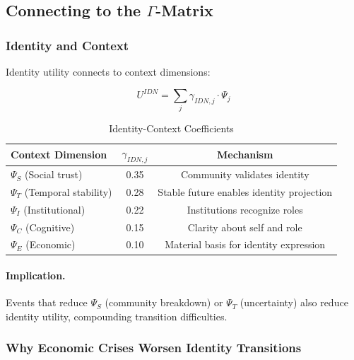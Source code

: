 \subsection{Connecting to the $\Gamma$-Matrix}

\subsubsection{Identity and Context}

Identity utility connects to context dimensions:

\begin{equation}
U^{IDN} = \sum_j \gamma_{IDN,j} \cdot \Psi_j
\end{equation}

\begin{table}[htbp]
\centering
\caption{Identity-Context Coefficients}
\label{tab:identity-context}
\begin{tabular}{@{}lcc@{}}
\toprule
\textbf{Context Dimension} & \textbf{$\gamma_{IDN,j}$} & \textbf{Mechanism} \\
\midrule
$\Psi_S$ (Social trust) & 0.35 & Community validates identity \\
$\Psi_T$ (Temporal stability) & 0.28 & Stable future enables identity projection \\
$\Psi_I$ (Institutional) & 0.22 & Institutions recognize roles \\
$\Psi_C$ (Cognitive) & 0.15 & Clarity about self and role \\
$\Psi_E$ (Economic) & 0.10 & Material basis for identity expression \\
\bottomrule
\end{tabular}
\end{table}

\paragraph{Implication.}
Events that reduce $\Psi_S$ (community breakdown) or $\Psi_T$ (uncertainty) 
also reduce identity utility, compounding transition difficulties.

\subsubsection{Why Economic Crises Worsen Identity Transitions}

